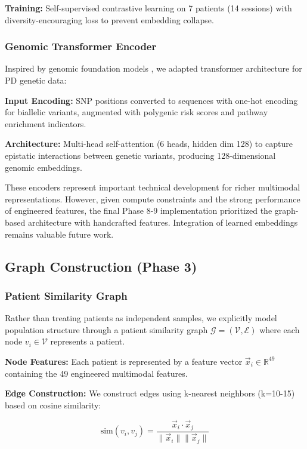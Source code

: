 \documentclass[conference]{IEEEtran}
\begin{document}
\textbf{Training:} Self-supervised contrastive learning on 7 patients (14 sessions) with diversity-encouraging loss to prevent embedding collapse.

\subsubsection{Genomic Transformer Encoder}

Inspired by genomic foundation models \cite{ji2021dnabert}, we adapted transformer architecture for PD genetic data:

\textbf{Input Encoding:} SNP positions converted to sequences with one-hot encoding for biallelic variants, augmented with polygenic risk scores and pathway enrichment indicators.

\textbf{Architecture:} Multi-head self-attention (6 heads, hidden dim 128) to capture epistatic interactions between genetic variants, producing 128-dimensional genomic embeddings.

These encoders represent important technical development for richer multimodal representations. However, given compute constraints and the strong performance of engineered features, the final Phase 8-9 implementation prioritized the graph-based architecture with handcrafted features. Integration of learned embeddings remains valuable future work.

\subsection{Graph Construction (Phase 3)}

\subsubsection{Patient Similarity Graph}

Rather than treating patients as independent samples, we explicitly model population structure through a patient similarity graph $\mathcal{G} = (\mathcal{V}, \mathcal{E})$ where each node $v_i \in \mathcal{V}$ represents a patient.

\textbf{Node Features:} Each patient is represented by a feature vector $\vec{x}_i \in \mathbb{R}^{49}$ containing the 49 engineered multimodal features.

\textbf{Edge Construction:} We construct edges using k-nearest neighbors (k=10-15) based on cosine similarity:

\begin{equation}
\text{sim}(v_i, v_j) = \frac{\vec{x}_i \cdot \vec{x}_j}{\|\vec{x}_i\| \|\vec{x}_j\|}
\end{equation}
\end{document}
